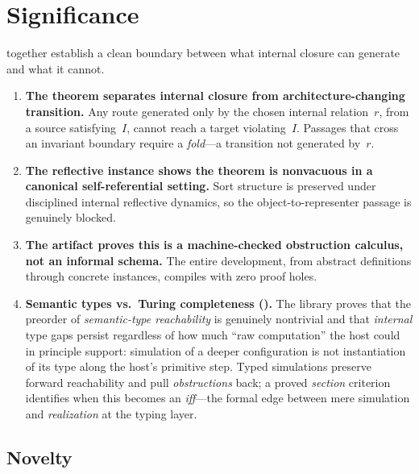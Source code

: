 \documentclass[11pt]{article}
\theoremstyle{plain}
\theoremstyle{definition}
\theoremstyle{remark}
\begin{document}
\section{Significance}\label{sec:significance}

 together establish a clean boundary
between what internal closure can generate and what it cannot.

\begin{enumerate}[label=(\arabic*),nosep,leftmargin=2em]
  \item \textbf{The theorem separates internal closure from architecture-changing
    transition.}  Any route generated only by the chosen internal relation~$r$, from a
    source satisfying~$I$, cannot reach a target violating~$I$.  Passages that cross an
    invariant boundary require a \emph{fold}---a transition not generated by~$r$.

  \item \textbf{The reflective instance shows the theorem is nonvacuous in a canonical
    self-referential setting.}  Sort structure is preserved under disciplined internal
    reflective dynamics, so the object-to-representer passage is genuinely blocked.

  \item \textbf{The artifact proves this is a machine-checked obstruction calculus, not
    an informal schema.}  The entire development, from abstract definitions through
    concrete instances, compiles with zero proof holes.

  \item \textbf{Semantic types vs.\ Turing completeness ().}
    The library proves that the preorder of \emph{semantic-type reachability} is
    genuinely nontrivial and that \emph{internal} type gaps persist regardless of how
    much ``raw computation'' the host could in principle support: simulation of a deeper
    configuration is not instantiation of its type along the host's primitive step.
    Typed simulations preserve forward reachability and pull \emph{obstructions} back;
    a proved \emph{section} criterion identifies when this becomes an \emph{iff}---the
    formal edge between mere simulation and \emph{realization} at the typing layer.
\end{enumerate}

\subsection*{Novelty}
\end{document}
